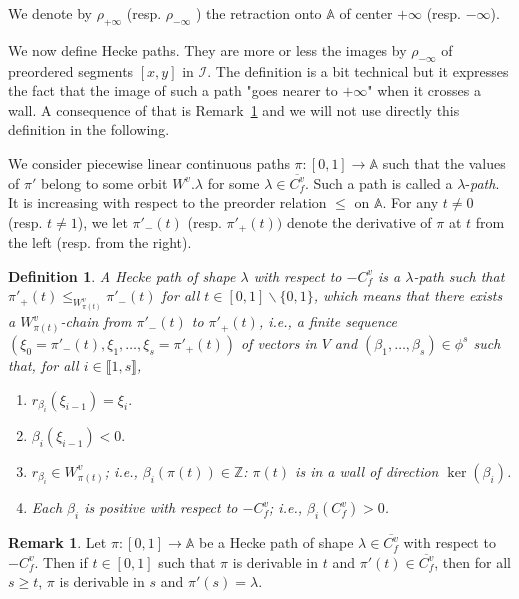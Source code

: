 \documentclass[12pt]{article}
\theoremstyle{plain}
\newtheorem{definition}[theorem]{Definition}
\theoremstyle{definition}
\newtheorem{rque}[theorem]{Remark}
\newcommand{\A}{\mathbb{A}}
\newcommand{\Z}{\mathbb{Z}}
\newcommand{\I}{\mathcal{I}}
\begin{document}
We denote by $\rho_{+\infty}$ (resp. $\rho_{-\infty}$ ) the retraction onto $\A$ of center $+\infty$ (resp. $-\infty$).

We now define Hecke paths. They are more or less the images by $\rho_{-\infty}$ of preordered segments $[x,y]$ in $\I$. The definition is a bit technical but it expresses the fact that the image of such a path "goes nearer to $+\infty$" when it crosses a wall. A consequence of that is Remark~\ref{rque chemins de Hecke} and we will not use directly this definition in the following.

 We consider piecewise linear continuous paths $\pi:[0,1]\rightarrow \A$ such that the values  of $\pi'$ belong to some orbit $W^v.\lambda$ for some $\lambda\in \overline{C_f^v}$. Such a path is called a $\lambda$-\textit{path}. It is increasing with respect to the preorder relation $\leq$ on $\A$. For any $t\neq 0$ (resp. $t\neq 1$), we let $\pi'_-(t)$ (resp. $\pi'_+(t))$ denote the derivative of $\pi$ at $t$ from the left (resp. from the right).

\begin{definition}
A Hecke path of shape $\lambda$ with respect to $-C_f^v$ is a $\lambda$-path such that
 $\pi'_+(t)\leq_{W^v_{\pi (t)}} \pi'_-(t)$ for all $t\in [0,1]\backslash \{0,1\}$, which 
 means that there exists a $W_{\pi(t)}^v$-chain from $\pi'_-(t)$ to $\pi'_{+}(t)$, i.e., a 
 finite sequence $(\xi_0=\pi'_-(t),\xi_1,\ldots, \xi_s=\pi'_+(t))$ of vectors in $V$ and
  $(\beta_1,\ldots,\beta_s)\in \phi^s$ such that, for all $i\in \llbracket 1,s\rrbracket$,
\begin{enumerate}
\item $r_{\beta_i}(\xi_{i-1})=\xi_i.$

\item $\beta_i(\xi_{i-1})<0.$

\item $r_{\beta_i}\in W^v_{\pi(t)}$; i.e., $\beta_i(\pi(t))\in \Z$: $\pi(t)$ is in a wall of direction $\ker(\beta_i)$.

\item Each $\beta_i$ is positive with respect to $-C_f^v$; i.e., $\beta_i(C_f^v)>0$.
\end{enumerate}
\end{definition}

\begin{rque}\label{rque chemins de Hecke}
Let $\pi:[0,1]\rightarrow \A$ be a Hecke path of shape $\lambda\in \overline{C_f^v}$ with respect to $-C^v_f$. Then if $t\in [0,1]$ such that $\pi$ is derivable in $t$ and $\pi'(t)\in \overline{C_f^v}$, then for all $s\geq t$, $\pi$ is derivable in $s$ and $\pi'(s)=\lambda$.
\end{rque}
\end{document}
